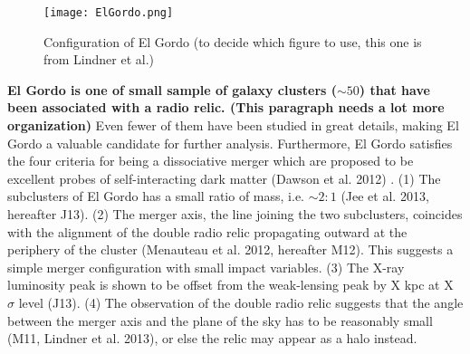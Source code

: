 %
%
\begin{figure}
	\texttt{[image: ElGordo.png]}
	\caption{Configuration of El Gordo (to decide which figure to use,
	this one is from Lindner et al.) \label{fig:config}}
\end{figure}
\textbf{El Gordo is one of small sample of galaxy clusters ($\sim 50$) that have
been associated with a radio relic. (This paragraph needs a lot more
organization)} Even fewer of them have been studied in
great details, making El Gordo a valuable candidate for further analysis. 
%
%
Furthermore, El Gordo satisfies the four criteria for being a dissociative merger which are proposed to be excellent
probes of self-interacting dark matter (Dawson et al. 2012) . (1) The subclusters
of El Gordo has a small ratio of mass, i.e. $\sim 2:1$ (Jee et al. 2013,
hereafter J13). (2) The merger axis, the line joining the two subclusters,
coincides with the alignment of the double radio relic propagating outward at the periphery of the cluster (Menauteau et al. 2012,
hereafter M12). This suggests a simple merger configuration with small
impact variables.  (3) The X-ray luminosity peak is shown to be offset
from the weak-lensing peak by X kpc at X $\sigma$ level (J13). (4) The
observation of the double radio relic suggests that the angle between the
merger axis and the plane of the sky has to be reasonably small (M11,
Lindner et al. 2013), or else
the relic may appear as a halo instead. \citep{S13} \par 


